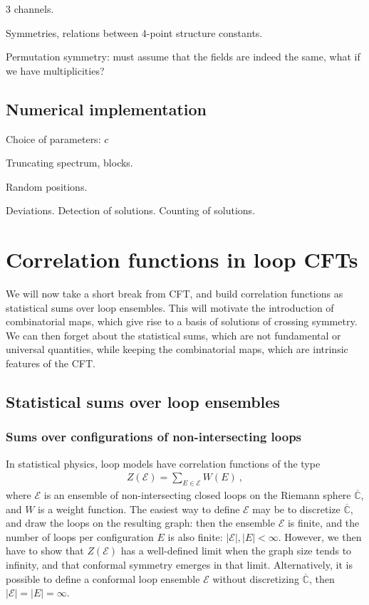 \documentclass[12pt, a4paper]{article}
\theoremstyle{break}
\begin{document}
3 channels. 

Symmetries, relations between 4-point structure constants. 

Permutation symmetry: must assume that the fields are indeed the same, what if we have multiplicities? 

\subsection{Numerical implementation}

Choice of parameters: $c$

Truncating spectrum, blocks.

Random positions.

Deviations. Detection of solutions. Counting of solutions.


\section{Correlation functions in loop CFTs} \label{sec:cloop}

We will now take a short break from CFT, and build correlation functions as statistical sums over loop ensembles. This will motivate the introduction of combinatorial maps, which give rise to a basis of solutions of crossing symmetry. We can then forget about the statistical sums, which are not fundamental or universal quantities, while keeping the combinatorial maps, which are intrinsic features of the CFT.

\subsection{Statistical sums over loop ensembles}

\subsubsection{Sums over configurations of non-intersecting loops}

In statistical physics, loop models have correlation functions of the type
\begin{align}
 Z(\mathcal{E}) = \sum_{E\in\mathcal{E}} W(E)\ , 
\end{align}
where $\mathcal{E}$ is an ensemble of non-intersecting closed loops on the Riemann sphere $\overline{\mathbb{C}}$, and $W$ is a weight function. The easiest way to define $\mathcal{E}$ may be to discretize $\overline{\mathbb{C}}$, and draw the loops on the resulting graph: then the ensemble $\mathcal{E}$ is finite, and the number of loops per configuration $E$ is also finite: $|\mathcal{E}|, |E|<\infty$. 
However, we then have to show that $Z(\mathcal{E})$ has a well-defined limit when the graph size tends to infinity, and that conformal symmetry emerges in that limit. Alternatively, it is possible to define a conformal loop ensemble $\mathcal{E}$ without discretizing $\overline{\mathbb{C}}$, then $|\mathcal{E}|=|E|=\infty$. 
 
\end{document}
